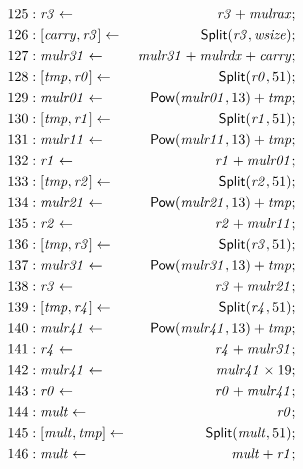 {\begin{multicols}{2}
\begin{align*}
125 &: \mathit{r3} \leftarrow & \mathit{r3} + \mathit{mulrax}; \\
126 &: \concat{\mathit{carry}}{\mathit{r3}} \leftarrow & \dslcode{Split}(\mathit{r3}, \mathit{wsize}); \\
127 &: \mathit{mulr31} \leftarrow & \mathit{mulr31} + \mathit{mulrdx} + \mathit{carry}; \\
128 &: \concat{\mathit{tmp}}{\mathit{r0}} \leftarrow & \dslcode{Split}(\mathit{r0}, 51); \\
129 &: \mathit{mulr01} \leftarrow & \dslcode{Pow}(\mathit{mulr01}, 13) + \mathit{tmp}; \\
130 &: \concat{\mathit{tmp}}{\mathit{r1}} \leftarrow & \dslcode{Split}(\mathit{r1}, 51); \\
131 &: \mathit{mulr11} \leftarrow & \dslcode{Pow}(\mathit{mulr11}, 13) + \mathit{tmp}; \\
132 &: \mathit{r1} \leftarrow & \mathit{r1} + \mathit{mulr01}; \\
133 &: \concat{\mathit{tmp}}{\mathit{r2}} \leftarrow & \dslcode{Split}(\mathit{r2}, 51); \\
134 &: \mathit{mulr21} \leftarrow & \dslcode{Pow}(\mathit{mulr21}, 13) + \mathit{tmp}; \\
135 &: \mathit{r2} \leftarrow & \mathit{r2} + \mathit{mulr11}; \\
136 &: \concat{\mathit{tmp}}{\mathit{r3}} \leftarrow & \dslcode{Split}(\mathit{r3}, 51); \\
137 &: \mathit{mulr31} \leftarrow & \dslcode{Pow}(\mathit{mulr31}, 13) + \mathit{tmp}; \\
138 &: \mathit{r3} \leftarrow & \mathit{r3} + \mathit{mulr21}; \\
139 &: \concat{\mathit{tmp}}{\mathit{r4}} \leftarrow & \dslcode{Split}(\mathit{r4}, 51); \\
140 &: \mathit{mulr41} \leftarrow & \dslcode{Pow}(\mathit{mulr41}, 13) + \mathit{tmp}; \\
141 &: \mathit{r4} \leftarrow & \mathit{r4} + \mathit{mulr31}; \\
142 &: \mathit{mulr41} \leftarrow & \mathit{mulr41} \times 19; \\
143 &: \mathit{r0} \leftarrow & \mathit{r0} + \mathit{mulr41}; \\
144 &: \mathit{mult} \leftarrow & \mathit{r0}; \\
145 &: \concat{\mathit{mult}}{\mathit{tmp}} \leftarrow & \dslcode{Split}(\mathit{mult}, 51); \\
146 &: \mathit{mult} \leftarrow & \mathit{mult} + \mathit{r1}; \\

\end{align*}
\end{multicols}}
